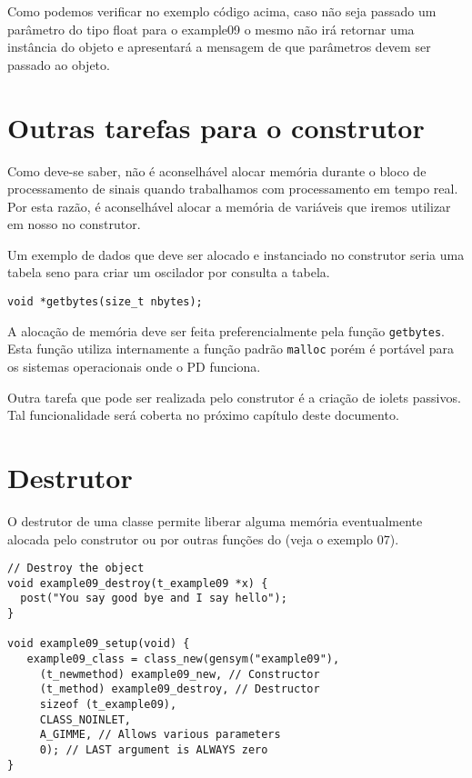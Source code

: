 Como podemos verificar no exemplo código acima, caso não seja passado um parâmetro
do tipo float para o example09 o mesmo não irá retornar uma instância do objeto
e apresentará a mensagem de que parâmetros devem ser passado ao objeto.

\section{Outras tarefas para o construtor}

Como deve-se saber, não é aconselhável alocar memória durante o bloco de
processamento de sinais quando trabalhamos com processamento em tempo real.
Por esta razão, é aconselhável alocar a memória de variáveis que iremos utilizar
em nosso \external no construtor.

Um exemplo de dados que deve ser alocado e instanciado no construtor seria uma
tabela seno para criar um oscilador por consulta a tabela.

\begin{lstlisting}[caption=Função para a alocação de memória]
void *getbytes(size_t nbytes);
\end{lstlisting}

A alocação de memória deve ser feita preferencialmente pela função \texttt{getbytes}.
Esta função utiliza internamente a função padrão \texttt{malloc} porém é portável
para os sistemas operacionais onde o PD funciona.

Outra tarefa que pode ser realizada pelo construtor é a criação de iolets
passivos.
Tal funcionalidade será coberta no próximo capítulo deste documento.

\section{Destrutor}

O destrutor de uma classe permite liberar alguma memória eventualmente alocada
pelo construtor ou por outras funções do \external (veja o exemplo 07).

\begin{lstlisting}[caption=Exemplo de destrutor]
// Destroy the object
void example09_destroy(t_example09 *x) {
  post("You say good bye and I say hello");
}

void example09_setup(void) {
   example09_class = class_new(gensym("example09"),
     (t_newmethod) example09_new, // Constructor
     (t_method) example09_destroy, // Destructor
     sizeof (t_example09),
     CLASS_NOINLET,
     A_GIMME, // Allows various parameters
     0); // LAST argument is ALWAYS zero
}
\end{lstlisting}

